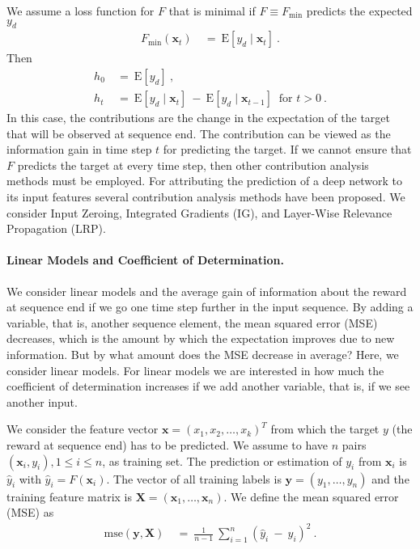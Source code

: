 \documentclass{article}
\newcommand\Bx{\bm{x}}
\newcommand\By{\bm{y}}
\newcommand\BX{\bm{X}}
\newcommand\EXP{\mathbf{\mathrm{E}}}
\renewcommand{\leq}{\leqslant}
\begin{document}
\begin{appendices}
We assume a loss function for $F$ that is minimal if $F \equiv F_{\min}$ predicts the expected
$y_d$
\begin{align}
 F_{\min}(\Bx_t) \ &= \ \EXP \left[ y_d \mid \Bx_t \right] \ . 
\end{align} 
Then 
\begin{align}
 h_0 \ &= \   \EXP \left[ y_d  \right] \ , \\ 
 h_t \ &= \ \EXP \left[ y_d \mid \Bx_t \right] \ - \ 
 \EXP \left[ y_d \mid \Bx_{t-1} \right] \ \text{ for } t > 0 \ .
\end{align} 
In this case, the contributions are the change in the expectation of 
the target that will be observed at sequence end.
The contribution can be viewed as the information gain in time step $t$
for predicting the target.
If we cannot ensure that $F$ predicts the target at every time step,
then other contribution analysis methods must be employed.
For attributing the prediction of a deep
network to its input features several contribution analysis
methods have been proposed.
We consider Input Zeroing, 
Integrated Gradients (IG), and Layer-Wise Relevance Propagation (LRP).


\paragraph{Linear Models and Coefficient of Determination.}

We consider linear models and the average gain of information about
the reward at sequence end if we go one time step further in the 
input sequence.
By adding a variable, that is, another sequence element, the mean squared error (MSE)
decreases, which is the amount by which the expectation improves due to new information.
But by what amount does the MSE decrease in average? 
Here, we consider linear models.
For linear models we are interested in how much the coefficient of 
determination increases if we add another variable, that is, if we
see another input.

We consider the feature vector $\Bx=(x_1,x_2,\ldots,x_k)^T$ from which
the target $y$ (the reward at sequence end) has to be predicted. 
We assume to have $n$ pairs $(\Bx_i,y_i), 1\leq i \leq n$,
as training set. 
The prediction or estimation of $y_i$ from $\Bx_i$ is $\hat{y}_i$ with 
$\hat{y}_i=F(\Bx_i)$. The vector of all training labels is $\By=(y_1,\ldots,y_n)$ and
the training feature matrix is $\BX=(\Bx_1,\ldots,\Bx_n)$.
We define the mean squared error (MSE) as
\begin{align}
 \mathrm{mse}(\By,\BX) \ &= \ \frac{1}{n-1}\ 
 \sum_{i=1}^n \left( \hat{y}_i \ - \ y_i  \right)^2 \ . 
\end{align}



\end{appendices}
\end{document}
